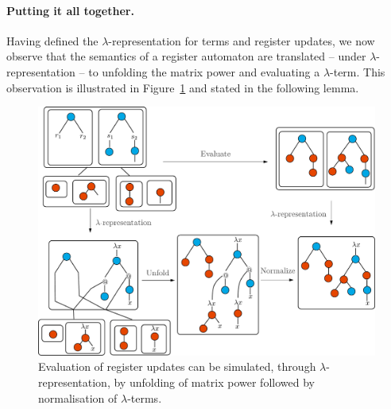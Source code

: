 \label{page:monotone-discussed}


\paragraph*{Putting it all together.}
Having defined the $\lambda$-representation for terms and register updates, we now observe  that the semantics of a register automaton are translated -- under $\lambda$-representation -- to unfolding the matrix power and evaluating a $\lambda$-term.  This observation is illustrated in Figure~\ref{fig:register-lambda} and stated in the following lemma.
\begin{figure}[]
    \centering
\includegraphics[scale=.3]{pictures/lambda-rep-diagram}   
    \caption{Evaluation of register updates can be simulated, through $\lambda$-representation, by unfolding of matrix power followed by normalisation of $\lambda$-terms.}
    \label{fig:register-lambda}
\end{figure}


